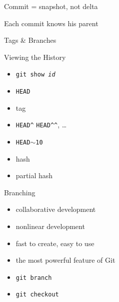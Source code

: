 \documentclass{beamer}
\begin{document}
\begin{frame}{Commit = snapshot, not delta}
  \begin{center}
  \end{center}
\end{frame}

\begin{frame}{Each commit knows his parent}
  \begin{center}
  \end{center}
\end{frame}

\begin{frame}{Tags \& Branches}
  \begin{center}
  \end{center}
\end{frame}

\begin{frame}{Viewing the History}
  \begin{itemize}
    \item \texttt{git show \textit{id}}
  \end{itemize}
  \pause
  \begin{itemize}
    \item \texttt{HEAD}
    \item tag
    \item \texttt{HEAD\textasciicircum}
      \texttt{HEAD\textasciicircum\textasciicircum}, \ldots
    \item \texttt{HEAD$\sim$10}
    \item hash
    \item partial hash
  \end{itemize}
\end{frame}

\begin{frame}{Branching}
  \begin{itemize}
    \item collaborative development
    \item nonlinear development
    \item fast to create, easy to use
    \item the most powerful feature of Git
  \end{itemize}
  \begin{itemize}
    \item \texttt{git branch}
    \item \texttt{git checkout}
  \end{itemize}
\end{frame}
\end{document}
